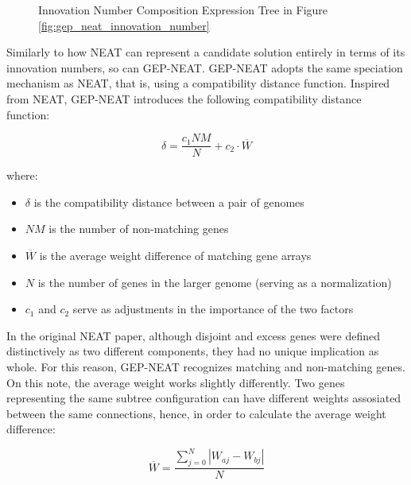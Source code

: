 \begin{figure}[H] %
	\centering %
	\caption{Innovation Number Composition Expression Tree in Figure \ref{fig:gep_neat_innovation_number}}
	\label{fig:gep_neat_innovation_number_composition} %
\end{figure}

\noindent Similarly to how NEAT can represent a candidate solution entirely in terms of its innovation numbers, so can GEP-NEAT. GEP-NEAT adopts the same speciation mechanism as NEAT, that is, using a compatibility distance function. Inspired from NEAT, GEP-NEAT introduces the following compatibility distance function:

\begin{equation}\label{alg:speciation}
    \delta = \frac{c_1NM}{N} + c_2\cdot{\overline{W}}
\end{equation}

\noindent where:
\begin{itemize}
    \item $\delta$ is the compatibility distance between a pair of genomes
    \item $NM$ is the number of non-matching genes
    \item $\overline{W}$ is the average weight difference of matching gene arrays
    \item $N$ is the number of genes in the larger genome (serving as a normalization)
    \item $c_1$ and $c_2$ serve as adjustments in the importance of the two factors
\end{itemize}

\noindent In the original NEAT paper, although disjoint and excess genes were defined distinctively as two different components, they had no unique implication  as whole. For this reason, GEP-NEAT recognizes matching and non-matching genes. On this note, the average weight works slightly differently. Two genes representing the same subtree configuration can have different weights assosiated between the same connections, hence, in order to calculate the average weight difference:

\begin{equation}\label{alg:weight_difference}
    \overline{W} = \frac{\sum_{j=0}^{N}|W_{aj} - W_{bj}|}{N}
\end{equation}

